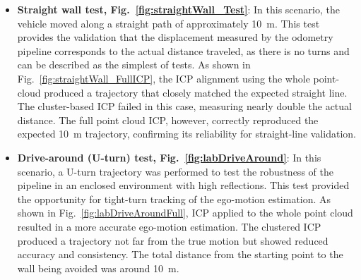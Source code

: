 \begin{itemize}
    \item \textbf{Straight wall test, Fig.~\ref{fig:straightWall_Test}}:  
    In this scenario, the vehicle moved along a straight path of approximately 10~m.  
    This test provides the validation that the displacement measured by the odometry pipeline corresponds to the actual distance traveled, as there is no turns and can be described as the simplest of tests.  
    As shown in Fig.~\ref{fig:straightWall_FullICP}, the ICP alignment using the whole point-cloud produced a trajectory that closely matched the expected straight line.
    The cluster-based ICP failed in this case, measuring nearly double the actual distance.  
    The full point cloud ICP, however, correctly reproduced the expected 10~m trajectory, confirming its reliability for straight-line validation. 
    
    \item \textbf{Drive-around (U-turn) test, Fig.~\ref{fig:labDriveAround}}:  
    In this scenario, a U-turn trajectory was performed to test the robustness of the pipeline in an enclosed environment with high reflections.  
    This test provided the opportunity for tight-turn tracking of the ego-motion estimation.  
    As shown in Fig.~\ref{fig:labDriveAroundFull}, ICP applied to the whole point cloud resulted in a more accurate ego-motion estimation.  
    The clustered ICP produced a trajectory not far from the true motion but showed reduced accuracy and consistency.  
    The total distance from the starting point to the wall being avoided was around 10~m.  
\end{itemize}


